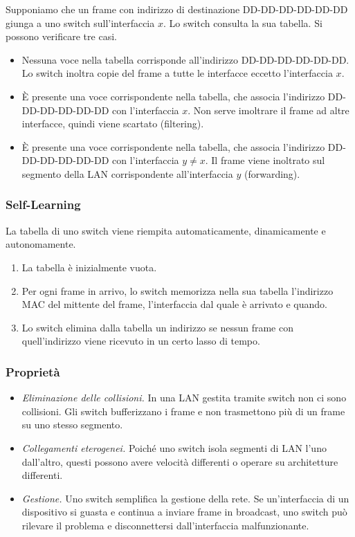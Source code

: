 \documentclass[11pt]{book}
\begin{document}
Supponiamo che un frame con indirizzo di destinazione DD-DD-DD-DD-DD-DD giunga a uno switch sull'interfaccia $x$. Lo switch 
consulta la sua tabella. Si possono verificare tre casi.
\begin{itemize}
    \item Nessuna voce nella tabella corrisponde all'indirizzo DD-DD-DD-DD-DD-DD. Lo switch inoltra copie del frame a tutte 
    le interfacce eccetto l'interfaccia $x$.
    \item È presente una voce corrispondente nella tabella, che associa l'indirizzo DD-DD-DD-DD-DD-DD con l'interfaccia 
    $x$. Non serve imoltrare il frame ad altre interfacce, quindi viene scartato (filtering).
    \item È presente una voce corrispondente nella tabella, che associa l'indirizzo DD-DD-DD-DD-DD-DD con l'interfaccia 
    $y\neq x$. Il frame viene inoltrato sul segmento della LAN corrispondente all'interfaccia $y$ (forwarding).
\end{itemize}
\subsubsection{Self-Learning}
La tabella di uno switch viene riempita automaticamente, dinamicamente e autonomamente.
\begin{enumerate}
    \item La tabella è inizialmente vuota.
    \item Per ogni frame in arrivo, lo switch memorizza nella sua tabella l'indirizzo MAC del mittente del frame, l'interfaccia 
    dal quale è arrivato e quando. 
    \item Lo switch elimina dalla tabella un indirizzo se nessun frame con quell'indirizzo viene ricevuto in un certo lasso 
    di tempo.
\end{enumerate}
\subsubsection{Proprietà}
\begin{itemize}
    \item \textit{Eliminazione delle collisioni.} In una LAN gestita tramite switch non ci sono collisioni. Gli switch 
    bufferizzano i frame e non trasmettono più di un frame su uno stesso segmento. 
    \item \textit{Collegamenti eterogenei.} Poiché uno switch isola segmenti di LAN l'uno dall'altro, questi possono avere 
    velocità differenti o operare su architetture differenti.
    \item \textit{Gestione.} Uno switch semplifica la gestione della rete. Se un'interfaccia di un dispositivo si guasta 
    e continua a inviare frame in broadcast, uno switch può rilevare il problema e disconnettersi dall'interfaccia malfunzionante.
\end{itemize}
\end{document}
